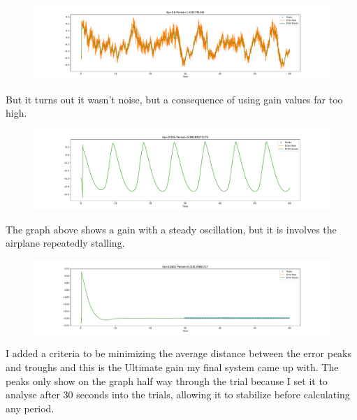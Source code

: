 \documentclass[11pt]{scrartcl} %
\begin{document}
\begin{figure}[ht!] %
	\centering
	\includegraphics[trim={5cm 0 5cm 0},clip,width=\textwidth]{PIDnoiseGauss.pdf} 
\end{figure}

But it turns out it wasn't noise, but a consequence of using gain values far too high.

\clearpage

\begin{figure}[ht!] %
	\centering
	\includegraphics[trim={5cm 0 5cm 0},clip,width=\textwidth]{PIDstalling.pdf} 
\end{figure}

The graph above shows a gain with a steady oscillation, but it is involves the airplane repeatedly stalling.

\begin{figure}[ht!] %
	\centering
	\includegraphics[trim={5cm 0 5cm 0},clip,width=\textwidth]{PIDultimate.pdf} 
\end{figure}

I added a criteria to be minimizing the average distance between the error peaks and troughs and this is the Ultimate gain my final system came up with. The peaks only show on the graph half way through the trial because I set it to analyse after 30 seconds into the trials, allowing it to stabilize before calculating any period.\\
\end{document}
